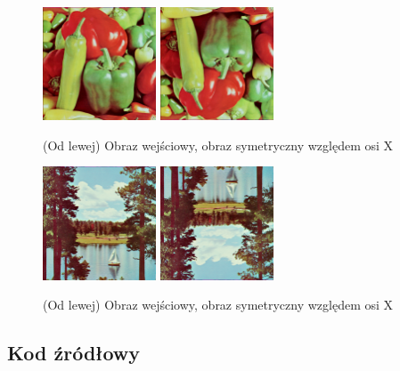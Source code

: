 \documentclass[final,a4paper,openany,12pt]{mwbk}
\begin{document}
\begin{figure}[H]
	\begin{center}
		\includegraphics[width=0.3\textwidth]{1/1Geo_ox_Original}
		\includegraphics[width=0.3\textwidth]{1/1Geo_ox_Result}
	\end{center}
	\caption{(Od lewej) Obraz wejściowy, obraz symetryczny względem osi X }
\end{figure}

\begin{figure}[H]
	\begin{center}
		\includegraphics[width=0.3\textwidth]{2/2Geo_ox_Original}
		\includegraphics[width=0.3\textwidth]{2/2Geo_ox_Result}
	\end{center}
	\caption{(Od lewej) Obraz wejściowy, obraz symetryczny względem osi X }
\end{figure}

\subsection*{Kod źródłowy}
\end{document}
